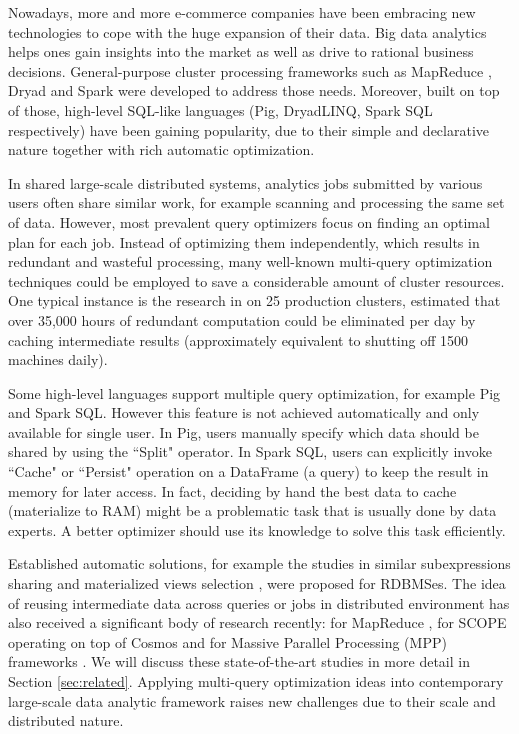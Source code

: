 Nowadays, more and more e-commerce companies have been embracing new technologies to cope with the huge expansion of their data. Big data analytics helps ones gain insights into the market as well as drive to rational business decisions. General-purpose cluster processing frameworks such as MapReduce \cite{dean2008mapreduce}, Dryad \cite{isard2007dryad} and Spark \cite{zaharia2012resilient} were developed to address those needs. Moreover, built on top of those, high-level SQL-like languages (Pig, DryadLINQ, Spark SQL respectively) have been gaining popularity, due to their simple and declarative nature together with rich automatic optimization.

In shared large-scale distributed systems, analytics jobs submitted by various users often share similar work, for example scanning and processing the same set of data. However, most prevalent query optimizers focus on finding an optimal plan for each job. Instead of optimizing them independently, which results in redundant and wasteful processing, many well-known multi-query optimization techniques could be employed to save a considerable amount of cluster resources. One typical instance is the research in \cite{gunda2010nectar} on 25 production clusters, estimated that over 35,000 hours of redundant computation could be eliminated per day by caching intermediate results (approximately equivalent to shutting off 1500 machines daily).

Some high-level languages support multiple query optimization, for example Pig and Spark SQL. However this feature is not achieved automatically and only available for single user. In Pig, users manually specify which data should be shared by using the ``Split" operator. In Spark SQL, users can explicitly invoke ``Cache" or ``Persist" operation on a DataFrame (a query) to keep the result in memory for later access. In fact, deciding by hand the best data to cache (materialize to RAM) might be a problematic task that is usually done by data experts. A better optimizer should use its knowledge to solve this task efficiently.

Established automatic solutions, for example the studies in similar subexpressions sharing \cite{zhou2007efficient} and materialized views selection \cite{goldstein2001optimizing, mistry2001materialized}, were proposed for RDBMSes. The idea of reusing intermediate data across queries or jobs in distributed environment has also received a significant body of research  recently: for MapReduce \cite{mrshare, mqo}, for SCOPE operating on top of Cosmos \cite{silva2012exploiting} and for Massive Parallel Processing (MPP) frameworks \cite{el2015optimization}. We will discuss these state-of-the-art studies in more detail in Section \ref{sec:related}. Applying multi-query optimization ideas into contemporary large-scale data analytic framework raises new challenges due to their scale and distributed nature.


